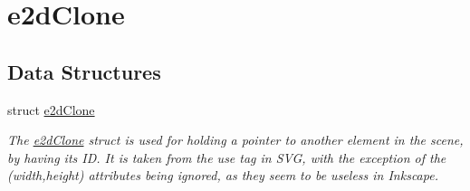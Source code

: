 \hypertarget{group__e2dClone}{\section{e2d\-Clone}
\label{group__e2dClone}
}
\subsection*{Data Structures}
\begin{DoxyCompactItemize}
\item 
struct \hyperlink{structe2dClone}{e2d\-Clone}
\begin{DoxyCompactList}\small\item\em The \hyperlink{structe2dClone}{e2d\-Clone} struct is used for holding a pointer to another element in the scene, by having its I\-D. It is taken from the use tag in S\-V\-G, with the exception of the (width,height) attributes being ignored, as they seem to be useless in Inkscape. \end{DoxyCompactList}\end{DoxyCompactItemize}
